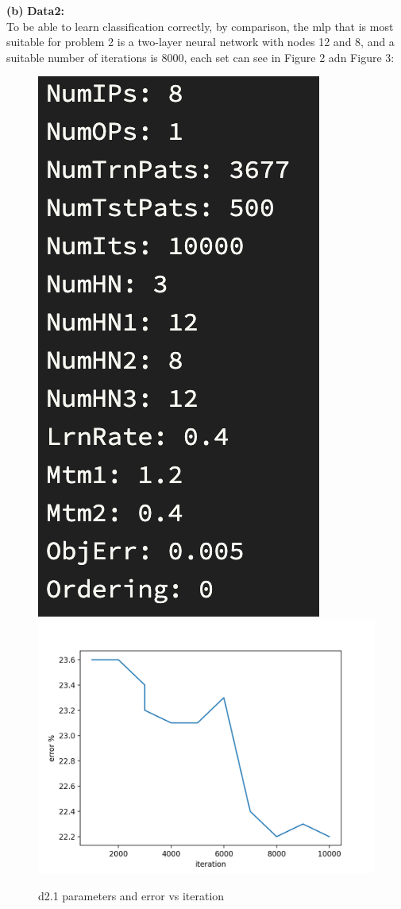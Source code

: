 \documentclass[11pt]{article}
\renewcommand\part[1]{\vspace{.10in}\textbf{(#1)}}
\newcommand\two{\vspace{.10in}\textbf{Data2: }}
\begin{document}
\part{b} \two\\
To be able to learn classification correctly, by comparison, the mlp that is most suitable for problem 2 is a two-layer neural network with nodes 12 and 8, and a suitable number of iterations is 8000, each set can see in Figure 2 adn Figure 3:
\begin{figure}[!ht]
    \centering
    \includegraphics[scale=0.8]{2-2par.png}
    \includegraphics[scale=1]{Figure_2-2.png}
	\caption{d2.1 parameters and error vs iteration}
\end{figure}
\end{document}
